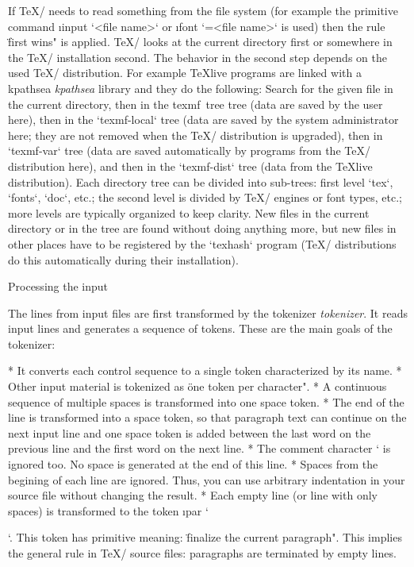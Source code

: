 If \TeX/ needs to read something from the file system (for example the
primitive command \i input `<file name>` or 
\i font `=<file name>` is used) 
then the rule
\"first wins" is applied. \TeX/ looks at the current directory first or
somewhere in the \TeX/ installation second. The behavior in the second step
depends on the used \TeX/ distribution. For example 
\ii TeXlive  programs are
linked with a \ii kpathsea {\em kpathsea} library and they do the following: Search for the given
file in the current directory, then in the \ii texmf~tree  tree (data are saved by
the user here), then in the `texmf-local` tree (data are saved by the system administrator
here; they are not removed when the \TeX/ distribution is upgraded), 
then in `texmf-var` tree (data are saved automatically by programs from the
\TeX/ distribution here), and then in the `texmf-dist` tree (data from the \TeX live
distribution). Each directory tree can be divided into sub-trees: first level
`tex`, `fonts`, `doc`, etc.; the second level is divided by \TeX/ engines or font types, etc.;
more levels are typically organized to keep clarity.
New files in the current directory or in the  tree are found without 
doing anything more, but new files in other places have to be registered by the `texhash`
program (\TeX/ distributions do this automatically during their installation).


\sec Processing the input

The lines from input files are first transformed by the \ii tokenizer {\em tokenizer}.
It reads input lines and generates a sequence of tokens. These are the
main goals of the tokenizer:

\begitems
* It converts each control sequence to a single token characterized by its name.
* Other input material is tokenized as \"one token per character".
* A continuous sequence of multiple spaces is transformed into one space token.
* The end of the line is transformed into a space token, so that paragraph text
  can continue on the next input line and one space token is added between the last word
  on the previous line and the first word on the next line.
* The comment character `%
  is ignored too. No space is generated at the end of this line.
* Spaces from the begining of each line are ignored. Thus, you can
  use arbitrary indentation in your source file without changing the result.
* Each empty line (or line with only spaces) is transformed to the token
  \i par `\par`. This token has primitive meaning: \"finalize the current paragraph".
  This implies the general rule in \TeX/ source files: paragraphs are terminated 
  by empty lines. 
\enditems

